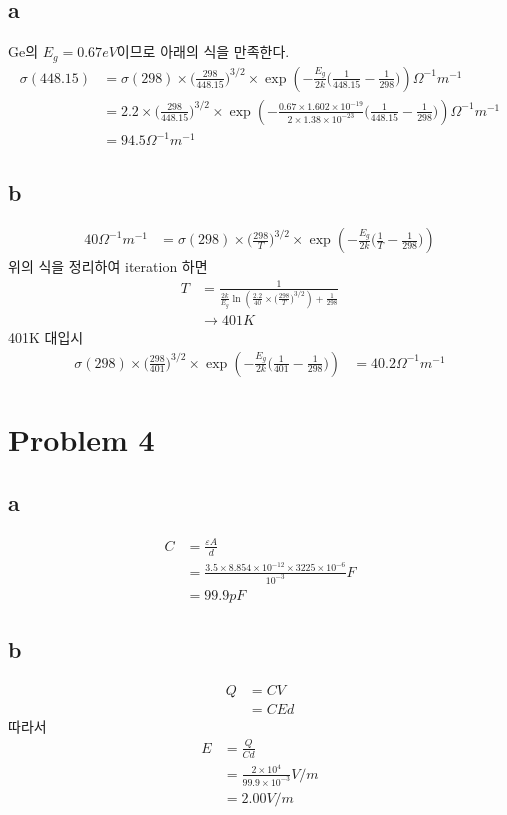 \documentclass[a4paper]{oblivoir}
\begin{document}
\subsection{a}
Ge의 $E_{g} = 0.67eV$이므로 아래의 식을 만족한다.
\begin{align}
	\sigma(448.15) &= \sigma(298)\times\Bigg(\frac{298}{448.15}\Bigg)^{3/2}\times \exp(-\frac{E_{g}}{2k}\Bigg(\frac{1}{448.15}-\frac{1}{298}\Bigg))\Omega^{-1} m^{-1}\\
	&=2.2\times\Bigg(\frac{298}{448.15}\Bigg)^{3/2}\times \exp(-\frac{0.67\times 1.602\times10^{-19}}{2\times 1.38\times 10^{-23}}\Bigg(\frac{1}{448.15}-\frac{1}{298}\Bigg))\Omega^{-1} m^{-1}\\
	&= 94.5\Omega^{-1} m^{-1}
\end{align}

\subsection{b}
\begin{align}
	40 \Omega^{-1} m^{-1} &= \sigma(298)\times\Bigg(\frac{298}{T}\Bigg)^{3/2}\times \exp(-\frac{E_{g}}{2k}\Bigg(\frac{1}{T}-\frac{1}{298}\Bigg))
\end{align}
위의 식을 정리하여 iteration 하면
\begin{align}
	T &= \frac{1}{\frac{2k}{E_{g}}\ln( \frac{2.2}{40}\times\Bigg(\frac{298}{T}\Bigg)^{3/2}) +\frac{1}{298}}\\
	&\rightarrow 401 K
\end{align}
401K 대입시 
\begin{align}
	\sigma(298)\times\Bigg(\frac{298}{401}\Bigg)^{3/2}\times \exp(-\frac{E_{g}}{2k}\Bigg(\frac{1}{401}-\frac{1}{298}\Bigg)) &= 40.2\Omega^{-1} m^{-1}
\end{align}

\section{Problem 4}
\subsection{a}
\begin{align}
	C &= \frac{\varepsilon A}{d} \\
	&= \frac{3.5 \times 8.854\times10^{-12} \times 3225 \times 10^{-6} }{10^{-3}}F\\
	&= 99.9pF
\end{align}

\subsection{b}
\begin{align}
	 Q &= CV\\
	&= CEd
\end{align}
따라서 
\begin{align}
	E &= \frac{Q}{Cd}\\
	&= \frac{2\times 10^{4}}{99.9 \times 10^{-3}} V/m\\
	&= 2.00 V/m
\end{align}
\end{document}

